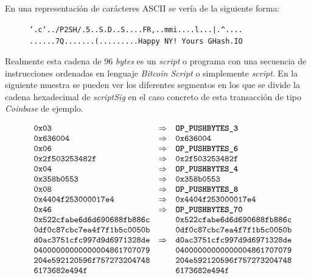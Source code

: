 \documentclass{article}
\begin{document}
    En una representación de carácteres ASCII se vería de la siguiente forma:
    \begin{figure}[H]
    \centering
        \texttt{`.c`../P2SH/.5..S.D..S....FR,..mmi....l...|.\textasciicircum....}
        \texttt{......7Q.......(.........Happy NY! Yours GHash.IO}
    \end{figure}
    
    Realmente esta cadena de 96 \textit{bytes} es un \textit{script} o programa con una secuencia de instrucciones ordenadas en lenguaje \textit{Bitcoin Script} o simplemente \textit{script}. En la siguiente muestra se pueden ver los diferentes segmentos en los que se divide la cadena hexadecimal de \textit{scriptSig} en el caso concreto de esta transacción de tipo \textit{Coinbase} de ejemplo.
    
    \begin{figure}[H]
        $\begin{array}{lcl}
            \texttt{0x03} & \Rightarrow & \textbf{\texttt{OP\_PUSHBYTES\_3}} \\
            \texttt{0x636004} & \Rightarrow & \texttt{0x636004}\\
            \texttt{0x06} & \Rightarrow & \textbf{\texttt{OP\_PUSHBYTES\_6}} \\
            \texttt{0x2f503253482f} & \Rightarrow & \texttt{0x2f503253482f} \\
            \texttt{0x04} & \Rightarrow & \textbf{\texttt{OP\_PUSHBYTES\_4}} \\
            \texttt{0x358b0553} & \Rightarrow & \texttt{0x358b0553} \\
            \texttt{0x08} & \Rightarrow & \textbf{\texttt{OP\_PUSHBYTES\_8}} \\
            \texttt{0x4404f253000017e4} & \Rightarrow & \texttt{0x4404f253000017e4} \\
            \texttt{0x46} & \Rightarrow & \textbf{\texttt{OP\_PUSHBYTES\_70}} \\
            \texttt{0x522cfabe6d6d690688fb886c} & & \texttt{0x522cfabe6d6d690688fb886c} \\
            \texttt{0df0c87cbc7ea4f7f1b5c0050b} & & \texttt{0df0c87cbc7ea4f7f1b5c0050b} \\
            \texttt{d0ac3751cfc997d9d6971328de} & \Rightarrow & \texttt{d0ac3751cfc997d9d6971328de} \\
            \texttt{04000000000000004861707079} & & \texttt{04000000000000004861707079} \\
            \texttt{204e592120596f757273204748} & & \texttt{204e592120596f757273204748} \\
            \texttt{6173682e494f} & & \texttt{6173682e494f}
        \end{array}$
    \end{figure}
    
\end{document}
